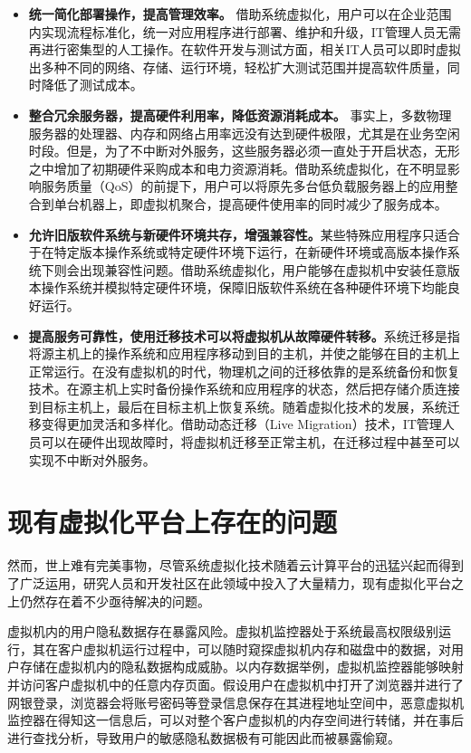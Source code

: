 \begin{itemize}
\item \textbf{统一简化部署操作，提高管理效率。}
借助系统虚拟化，用户可以在企业范围内实现流程标准化，统一对应用程序进行部署、维护和升级，IT管理人员无需再进行密集型的人工操作。在软件开发与测试方面，相关IT人员可以即时虚拟出多种不同的网络、存储、运行环境，轻松扩大测试范围并提高软件质量，同时降低了测试成本。
\item \textbf{整合冗余服务器，提高硬件利用率，降低资源消耗成本。}
事实上，多数物理服务器的处理器、内存和网络占用率远没有达到硬件极限，尤其是在业务空闲时段。但是，为了不中断对外服务，这些服务器必须一直处于开启状态，无形之中增加了初期硬件采购成本和电力资源消耗。借助系统虚拟化，在不明显影响服务质量（QoS）的前提下，用户可以将原先多台低负载服务器上的应用整合到单台机器上，即虚拟机聚合，提高硬件使用率的同时减少了服务成本。
\item \textbf{允许旧版软件系统与新硬件环境共存，增强兼容性。}某些特殊应用程序只适合于在特定版本操作系统或特定硬件环境下运行，在新硬件环境或高版本操作系统下则会出现兼容性问题。借助系统虚拟化，用户能够在虚拟机中安装任意版本操作系统并模拟特定硬件环境，保障旧版软件系统在各种硬件环境下均能良好运行。
\item \textbf{提高服务可靠性，使用迁移技术可以将虚拟机从故障硬件转移。}系统迁移是指将源主机上的操作系统和应用程序移动到目的主机，并使之能够在目的主机上正常运行。在没有虚拟机的时代，物理机之间的迁移依靠的是系统备份和恢复技术。在源主机上实时备份操作系统和应用程序的状态，然后把存储介质连接到目标主机上，最后在目标主机上恢复系统。随着虚拟化技术的发展，系统迁移变得更加灵活和多样化。借助动态迁移（Live Migration）技术，IT管理人员可以在硬件出现故障时，将虚拟机迁移至正常主机，在迁移过程中甚至可以实现不中断对外服务。
\end{itemize}

\section{现有虚拟化平台上存在的问题}

然而，世上难有完美事物，尽管系统虚拟化技术随着云计算平台的迅猛兴起而得到了广泛运用，研究人员和开发社区在此领域中投入了大量精力，现有虚拟化平台之上仍然存在着不少亟待解决的问题。

虚拟机内的用户隐私数据存在暴露风险。虚拟机监控器处于系统最高权限级别运行，其在客户虚拟机运行过程中，可以随时窥探虚拟机内存和磁盘中的数据，对用户存储在虚拟机内的隐私数据构成威胁。以内存数据举例，虚拟机监控器能够映射并访问客户虚拟机中的任意内存页面。假设用户在虚拟机中打开了浏览器并进行了网银登录，浏览器会将账号密码等登录信息保存在其进程地址空间中，恶意虚拟机监控器在得知这一信息后，可以对整个客户虚拟机的内存空间进行转储，并在事后进行查找分析，导致用户的敏感隐私数据极有可能因此而被暴露偷窥。

